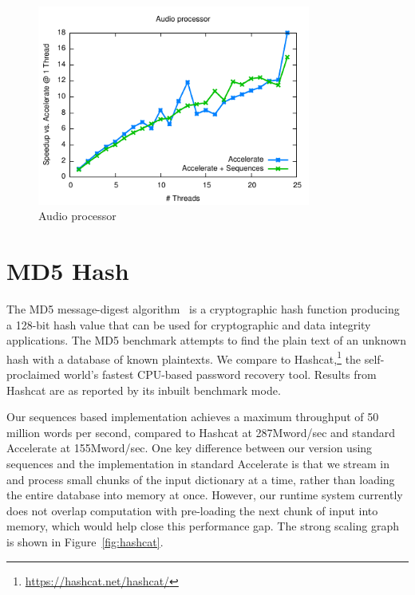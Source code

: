 \begin{figure}
\centering
\includegraphics[width=0.8\textwidth]{benchmarks/zero-crossings/figs/zero-crossings.pdf}
\caption{Audio processor}
\label{fig:zero-crossings}
\end{figure}


\section{MD5 Hash}

The MD5 message-digest algorithm~\cite{Rivest:MD5} is a cryptographic hash
function producing a 128-bit hash value that can be used for cryptographic and
data integrity applications. The MD5 benchmark attempts to find the plain text
of an unknown hash with a database of known plaintexts.
%
%
We compare to Hashcat,\footnote{\url{https://hashcat.net/hashcat/}} the
self-proclaimed world's fastest CPU-based password recovery tool. Results from
Hashcat are as reported by its inbuilt benchmark mode.

Our sequences based implementation achieves a maximum throughput of 50 million
words per second, compared to Hashcat at 287Mword/sec and standard Accelerate at
155Mword/sec. One key difference between our version using sequences and the
implementation in standard Accelerate is that we stream in and process small
chunks of the input dictionary at a time, rather than loading the entire
database into memory at once. However, our runtime system currently does not
overlap computation with pre-loading the next chunk of input into memory, which
would help close this performance gap. The strong scaling graph is shown in
Figure~\ref{fig:hashcat}.

